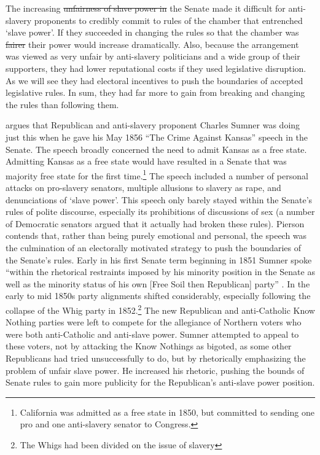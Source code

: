 \documentclass[a4paper]{article}\usepackage[]{graphicx}\usepackage[]{color}
\providecommand{\DIFaddtex}[1]{{\protect\color{blue}\uwave{#1}}} %
\providecommand{\DIFdeltex}[1]{{\protect\color{red}\sout{#1}}}                      %
\providecommand{\DIFaddbegin}{} %
\providecommand{\DIFaddend}{} %
\providecommand{\DIFdelbegin}{} %
\providecommand{\DIFdelend}{} %
\providecommand{\DIFadd}[1]{\texorpdfstring{\DIFaddtex{#1}}{#1}} %
\providecommand{\DIFdel}[1]{\texorpdfstring{\DIFdeltex{#1}}{}} %
\begin{document}
The increasing \DIFdelbegin \DIFdel{unfairness of slave power in }\DIFdelend \DIFaddbegin \DIFadd{disproportionality of }\DIFaddend the Senate made it difficult for anti-slavery proponents to credibly commit to rules of the chamber that entrenched `slave power'. If they succeeded in changing the rules so that the chamber was \DIFdelbegin \DIFdel{fairer }\DIFdelend \DIFaddbegin \DIFadd{more proportionate }\DIFaddend their power would increase dramatically. Also, because the arrangement was viewed as very unfair by anti-slavery politicians and a wide group of their supporters, they had lower reputational costs if they used legislative disruption. As we will see they had electoral incentives to push the boundaries of accepted legislative rules. In sum, they had far more to gain from breaking and changing the rules than following them.

\cite{Pierson1995} argues that Republican and anti-slavery proponent Charles Sumner was doing just this when he gave his May 1856 ``The Crime Against Kansas'' speech in the Senate. The speech broadly concerned the need to admit Kansas as a free state. Admitting Kansas as a free state would have resulted in a Senate that was majority free state for the first time.\footnote{California was admitted as a free state in 1850, but committed to sending one pro and one anti-slavery senator to Congress.} The speech included a number of personal attacks on pro-slavery senators, multiple allusions to slavery as rape, and denunciations of `slave power'. This speech only barely stayed within the Senate's rules of polite discourse, especially its prohibitions of discussions of sex (a number of Democratic senators argued that it actually had broken these rules). Pierson contends that, rather than being purely emotional and personal, the speech was the culmination of an electorally motivated strategy to push the boundaries of the Senate's rules. Early in his first Senate term beginning in 1851 Sumner spoke ``within the rhetorical restraints imposed by his minority position in the Senate as well as the minority status of his own [Free Soil then Republican] party'' \cite[534]{Pierson1995}. In the early to mid 1850s party alignments shifted considerably, especially following the collapse of the Whig party in 1852.\footnote{The Whigs had been divided on the issue of slavery} The new Republican and anti-Catholic Know Nothing parties were left to compete for the allegiance of Northern voters who were both anti-Catholic and anti-slave power. Sumner attempted to appeal to these voters, not by attacking the Know Nothings as bigoted, as some other Republicans had tried unsuccessfully to do, but by rhetorically emphasizing the problem of unfair slave power. He increased his rhetoric, pushing the bounds of Senate rules to gain more publicity for the Republican's anti-slave power position.
\end{document}
